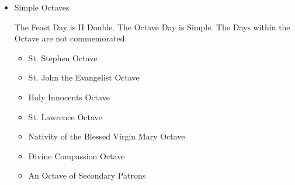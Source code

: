 \begin{itemize}
\begin{itemize}
            The Days within the Octave are Semidouble. A Double Feast occurring within a Common Octave has its Office with Commemoration of the Octave, unless otherwise noted.\par
            \textsc{Note,} Common Octaves are not commemorated during Lent.
                \begin{itemize}
                    \item Conception of the Blessed Virgin Mary Octave
                    \item Assumption of the Blessed Virgin Mary Octave
                    \item Nativity of St. John Baptist Octave
                    \item Solemnity of St. Joseph Octave
                    \item Sts. Peter \& Paul Octave
                    \item All Hallows Octave
                    \item The Octave of the principal patron saint of a church, cathedral, order, town, diocese, province, or nation. 
                \end{itemize}
            \item Simple Octaves\par
            The Feast Day is II Double. The Octave Day is Simple. The Days within the Octave are not commemorated.
                \begin{itemize}
                    \item St. Stephen Octave
                    \item St. John the Evangelist Octave
                    \item Holy Innocents Octave
                    \item St. Lawrence Octave
                    \item Nativity of the Blessed Virgin Mary Octave
                    \item Divine Compassion Octave
                    \item An Octave of Secondary Patrons
                \end{itemize}
        \end{itemize}
        

\end{itemize}
